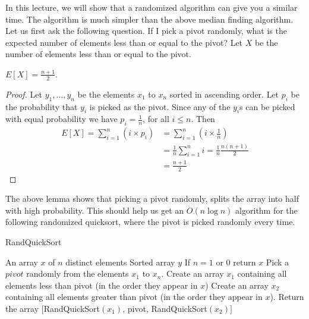 \noindent In this lecture, we will show that a randomized algorithm can give you a similar time. The algorithm is much simpler than the above median finding algorithm. Let us first ask the following question. If I pick a pivot randomly, what is the expected number of elements less than or equal to the pivot? Let $X$ be the number of elements less than or equal to the pivot.  
\begin{lemma}
$E[X] = \frac{n+1}{2}$.
\end{lemma}
\begin{proof}
Let $y_1,\dots,y_n$ be the elements $x_1$ to $x_n$ sorted in ascending order. Let $p_i$ be the probability that $y_i$ is picked as the pivot. Since any of the $y_i$s can be picked with equal probability we have $p_i = \frac{1}{n}$, for all $i \leq n$. Then
\begin{align*}
E[X] = \sum_{i=1}^n (i \times p_i) & = \sum_{i=1}^n (i \times \frac{1}{n}) \\
& = \frac{1}{n} \sum_{i=1}^n i = \frac{1}{n}  \frac{n (n+1)}{2} \\
& = \frac{n+1}{2}
\end{align*}
\end{proof}

\noindent The above lemma shows that picking a pivot randomly, splits the array into half with high probability.  This should help us get an $O(n \log n)$ algorithm for the following randomized quicksort, where the pivot is picked randomly every time.
\begin{algorithm}[H]
 \caption{RandQuickSort}
 \label{alg:randquicksort}
 \begin{algorithmic}[1]
 \renewcommand{\algorithmicrequire}{\textbf{Input:}}
 \renewcommand{\algorithmicensure}{\textbf{Output:}}
 \REQUIRE An array $x$ of $n$ distinct elements 
 \ENSURE  Sorted array $y$
 \STATE If $n = 1$ or $0$ return $x$
  \STATE Pick a $pivot$ randomly from the elements $x_1$ to $x_n$.
  \STATE Create an array $x_1$ containing all elements less than  pivot (in the order they appear in $x$) 
  \STATE Create an array $x_2$ containing all elements greater than pivot (in the order they appear in $x$).
  \STATE Return the array $[$RandQuickSort$(x_1)$, pivot, RandQuickSort$(x_2)]$
 \end{algorithmic} 
 \end{algorithm}
 
